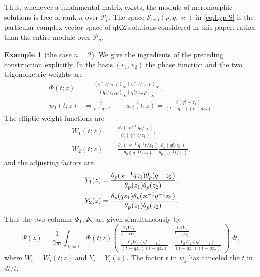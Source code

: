 \documentclass[12pt]{amsart}
\theoremstyle{definition}
\numberwithin{equation}{section}
\theoremstyle{definition}
\newtheorem*{example}{Example}
\let\mc\mathcal
\let\tht\theta
\def\beq{\begin{equation}}
\def\eeq{\end{equation}}
\begin{document}
Thus, whenever a fundamental matrix exists, the module of
meromorphic solutions is free of rank $n$ over $\mc P_p$.
The space $\mc S_{\mathrm{hyp}}(p,q,\varkappa)$ in
\eqref{eq:hyp-S} is the particular complex vector space of qKZ
solutions considered in this paper, rather than the entire module
over $\mc P_p$.


\begin{example}[the case $n=2$]
We give the ingredients of the preceding construction explicitly.
In the basis $(v_1,v_2)$ the phase function and the two
trigonometric weights are
\begin{align*}
 \Phi(t;z)&=\frac{(q^{-1}t/z_1;p)_\infty(q^{-1}t/z_2;p)_\infty}
 {(qt/z_1;p)_\infty(qt/z_2;p)_\infty},\\
 w_1(t;z)&=\frac{t}{t-qz_1},\qquad
 w_2(t;z)=\frac{t(qt-z_1)}{(t-qz_1)(t-qz_2)}.
\end{align*}
The elliptic weight functions are
\begin{align*}
 W_1(t;z)&=\frac{\tht_p(\varkappa^{-1}qt/z_1)}
 {\tht_p(q^{-1}t/z_1)},\\
 W_2(t;z)&=\frac{\tht_p(\varkappa^{-1}q^{-1}t/z_2)}
 {\tht_p(q^{-1}t/z_2)}
 \frac{\tht_p(qt/z_1)}{\tht_p(q^{-1}t/z_1)},
\end{align*}
and the adjusting factors are
\begin{align}
 Y_1(z)&=\frac{\tht_p(\varkappa^{-1}qz_1)\tht_p(q^{-1}z_2)}
 {\tht_p(z_1)\tht_p(z_2)},\notag\\
 Y_2(z)&=\frac{\tht_p(qz_1)\tht_p(\varkappa^{-1}q^{-1}z_2)}
 {\tht_p(z_1)\tht_p(z_2)}.\label{eq:n2-qkz-adjust}
\end{align}
Thus the two columns $\Psi_1,\Psi_2$ are given simultaneously by
\beq\label{eq:n2-qkz-integrals}
 \Psi(z)=\frac{1}{2\pi\mathrm{i}}\int_{|t|=1}\Phi(t;z)
 \begin{pmatrix}
 \displaystyle\frac{Y_1W_1}{t-qz_1}&
 \displaystyle\frac{Y_2W_2}{t-qz_1}\\[9pt]
 \displaystyle\frac{Y_1W_1(qt-z_1)}{(t-qz_1)(t-qz_2)}&
 \displaystyle\frac{Y_2W_2(qt-z_1)}{(t-qz_1)(t-qz_2)}
 \end{pmatrix}\,dt,
\eeq
where $W_i=W_i(t;z)$ and $Y_i=Y_i(z)$. The factor $t$ in
$w_j$ has canceled the $t$ in $dt/t$.


\end{example}
\end{document}
